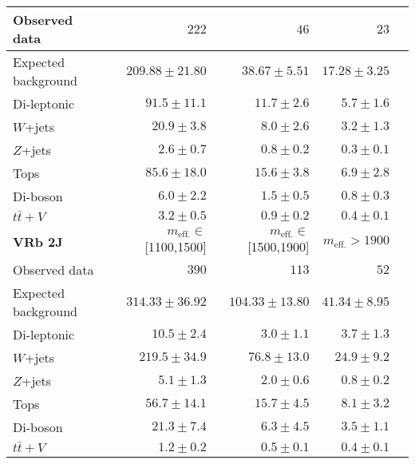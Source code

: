 \begin{table}
\begin{center}
\begin{tabular*}{\textwidth}{@{\extracolsep{\fill}}lrrrr}
Observed data          & $222$              & $46$              & $23$                    \\
\midrule
Expected background         & $209.88 \pm 21.80$          & $38.67 \pm 5.51$          & $17.28 \pm 3.25$              \\
\midrule
        Di-leptonic         & $91.5 \pm 11.1$          & $11.7 \pm 2.6$          & $5.7 \pm 1.6$              \\
        $W$+jets         & $20.9 \pm 3.8$          & $8.0 \pm 2.6$          & $3.2 \pm 1.3$              \\
        $Z$+jets         & $2.6 \pm 0.7$          & $0.8 \pm 0.2$          & $0.3 \pm 0.1$              \\
        Tops         & $85.6 \pm 18.0$          & $15.6 \pm 3.8$          & $6.9 \pm 2.8$              \\
        Di-boson         & $6.0 \pm 2.2$          & $1.5 \pm 0.5$          & $0.8 \pm 0.3$              \\
        $t\bar{t}+V$         & $3.2 \pm 0.5$          & $0.9 \pm 0.2$          & $0.4 \pm 0.1$              \\
\toprule
\textbf{VRb 2J} & $m_{\mathrm{eff.}}\in$[1100,1500] & $m_{\mathrm{eff.}}\in$[1500,1900] & $m_{\mathrm{eff.}}>1900$ \\
\midrule
Observed data          & $390$              & $113$              & $52$                    \\
\midrule
Expected background         & $314.33 \pm 36.92$          & $104.33 \pm 13.80$          & $41.34 \pm 8.95$              \\
\midrule
        Di-leptonic         & $10.5 \pm 2.4$          & $3.0 \pm 1.1$          & $3.7 \pm 1.3$              \\
        $W$+jets         & $219.5 \pm 34.9$          & $76.8 \pm 13.0$          & $24.9 \pm 9.2$              \\
        $Z$+jets         & $5.1 \pm 1.3$          & $2.0 \pm 0.6$          & $0.8 \pm 0.2$              \\
        Tops         & $56.7 \pm 14.1$          & $15.7 \pm 4.5$          & $8.1 \pm 3.2$              \\
        Di-boson         & $21.3 \pm 7.4$          & $6.3 \pm 4.5$          & $3.5 \pm 1.1$              \\
        $t\bar{t}+V$         & $1.2 \pm 0.2$          & $0.5 \pm 0.1$          & $0.4 \pm 0.1$              \\
        \bottomrule
        \end{tabular*}

  \end{center}
\end{table}




